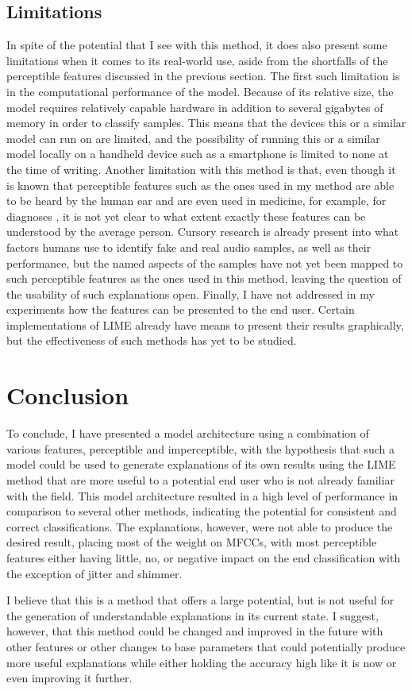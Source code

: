 \documentclass{article}
\begin{document}
		\subsection{Limitations}
		In spite of the potential that I see with this method, it does also present some
		limitations when it comes to its real-world use, aside from the shortfalls of the
		perceptible features discussed in the previous section. The first such limitation is in
		the computational performance of the model. Because of its relative size, the model
		requires relatively capable hardware in addition to several gigabytes of memory in order
		to classify samples. This means that the devices this or a similar model can run on are
		limited, and the possibility of running this or a similar model locally on a handheld
		device such as a smartphone is limited to none at the time of writing. Another limitation
		with this method is that, even though it is known that perceptible features such as the
		ones used in my method are able to be heard by the human ear and are even used in
		medicine, for example, for diagnoses \cite{chaiwongyen_deepfake-speech_2023}, it is not
		yet clear to what extent exactly these features can be understood by the average person.
		Cursory research \cite{sharevski_blind_2024} is already present into what factors humans
		use to identify fake and real audio samples, as well as their performance, but the named
		aspects of the samples have not yet been mapped to such perceptible features as the ones
		used in this method, leaving the question of the usability of such explanations open.
		Finally, I have not addressed in my experiments how the features can be presented to the
		end user. Certain implementations of LIME already have means to present their results
		graphically, but the effectiveness of such methods has yet to be studied.
	\section{Conclusion}
	To conclude, I have presented a model architecture using a combination of various features,
	perceptible and imperceptible, with the hypothesis that such a model could be used to generate
	explanations of its own results using the LIME method that are more useful to a potential end
	user who is not already familiar with the field. This model architecture resulted in a high
	level of performance in comparison to several other methods, indicating the potential for
	consistent and correct classifications. The explanations, however, were not able to produce
	the desired result, placing most of the weight on MFCCs, with most perceptible features either
	having little, no, or negative impact on the end classification with the exception of jitter
	and shimmer.
	\par
	I believe that this is a method that offers a large potential, but is not useful for the
	generation of understandable explanations in its current state. I suggest, however, that this
	method could be changed and improved in the future with other features or other changes to
	base parameters that could potentially produce more useful explanations while either holding
	the accuracy high like it is now or even improving it further.
	\newpage
	\sloppy
	\printbibliography
\end{document}
